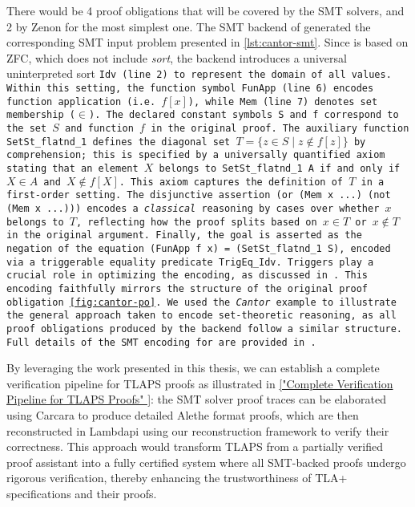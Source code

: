 There would be 4 proof obligations that will be covered by the SMT solvers, and 2 by Zenon for the most simplest one. 
The SMT backend of \tlaplus generated the corresponding SMT input problem presented in \cref{lst:cantor-smt}.
Since \tlaplus is based on ZFC, which does not include \emph{sort}, the backend introduces a universal uninterpreted sort \tt{Idv} (line 2) to represent the domain of all values.
Within this setting, the function symbol \tt{FunApp} (line 6) encodes function application (i.e. $f[x]$), while \tt{Mem} (line 7) denotes set membership ($\in$).
The declared constant symbols \tt{S} and \tt{f} correspond to the set $S$ and function $f$ in the original proof.
The auxiliary function \tt{SetSt\_flatnd\_1} defines the diagonal set $T = \{ z \in S \mid z \notin f[z] \}$ by comprehension; this is specified by a universally quantified axiom stating that an element $X$ belongs to \tt{SetSt\_flatnd\_1 A} if and only if $X \in A$ and $X \notin f[X]$.
This axiom captures the definition of $T$ in a first-order setting.
The disjunctive assertion \tt{(or (Mem x ...) (not (Mem x ...)))} encodes a \emph{classical} reasoning by cases over whether $x$ belongs to $T$, reflecting how the proof splits based on $x \in T$ or $x \notin T$ in the original \tlaplus argument. 
Finally, the goal is asserted as the negation of the equation \tt{(FunApp f x) = (SetSt\_flatnd\_1 S)}, encoded via a triggerable equality predicate \tt{TrigEq\_Idv}.
Triggers play a crucial role in optimizing the encoding, as discussed in \cite[\S3]{new-encoding-tlaps}.
%
This encoding faithfully mirrors the structure of the original \tlaplus proof obligation \cref{fig:cantor-po}.
We used the \textit{Cantor} example to illustrate the general approach taken to encode set-theoretic reasoning, as all proof obligations produced by the backend follow a similar structure.
Full details of the SMT encoding for \tlaplus are provided in \cite{new-encoding-tlaps}.

By leveraging the work presented in this thesis, we can establish a complete verification pipeline for TLAPS proofs as illustrated in \cref{"Complete Verification Pipeline for TLAPS Proofs"
}: the SMT solver proof traces can be elaborated using Carcara to produce detailed Alethe format proofs, which are then reconstructed in Lambdapi using our reconstruction framework to verify their correctness.
This approach would transform TLAPS from a partially verified proof assistant into a fully certified system where all SMT-backed proofs undergo rigorous verification, thereby enhancing the trustworthiness of TLA+ specifications and their proofs.

